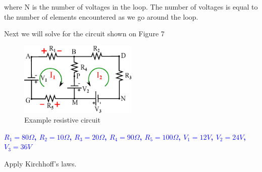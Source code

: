 \documentclass[a4 paper]{article}
\newcommand{\blue}[1]{\textcolor{blue}{#1}}
\numberwithin{equation}{section}
\newcommand{\0}{\mathbf{0}}
\begin{document}
where N is the number of voltages in the loop. The number of voltages is equal to the number of elements encountered as we go around the loop.

\vspace{60 mm}
Next we will solve for the circuit shown on Figure 7

\begin{figure}[ht!]
  \caption{Example resistive circuit}
  \centering
  \includegraphics[width=0.5\textwidth]{./images/circuit1/circuit5_1}
\end{figure}
\blue{\centerline{\bf $R_1 = 80\Omega$, $R_2 = 10\Omega$, $R_3 = 20\Omega$, $R_4 = 90\Omega$, $R_5 = 100\Omega$, $V_1 = 12V$, $V_2 = 24V$, $V_3 = 36V$}}

\vspace{8 mm}
Apply Kirchhoff's laws.
\end{document}
